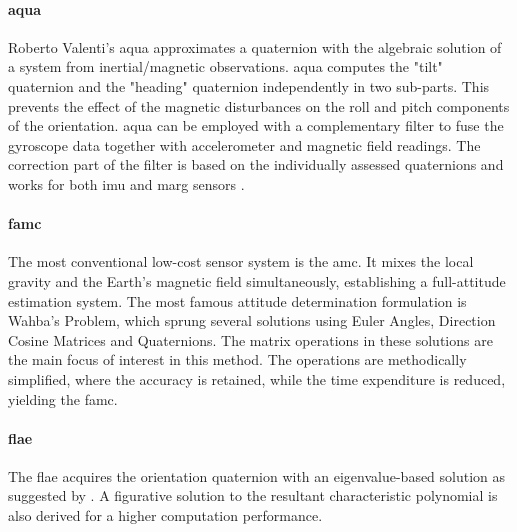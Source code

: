 \paragraph{\acrshort{aqua}}

Roberto Valenti's \acrfull{aqua} \cite{valenti2015keeping} approximates a quaternion with the algebraic solution of a system from inertial/magnetic observations.
\acrshort{aqua} computes the "tilt" quaternion and the "heading" quaternion independently in two sub-parts. This prevents the effect of the magnetic disturbances on the roll and pitch components of the orientation.
\acrshort{aqua} can be employed with a complementary filter to fuse the gyroscope data together with accelerometer and magnetic field readings. The correction part of the filter is based on the individually assessed quaternions and works for both \acrshort{imu} and \acrfull{marg} sensors \cite{valenti2015linear}.



\paragraph{\acrshort{famc}}

The most conventional low-cost sensor system is the \acrfull{amc}. It mixes the local gravity and the Earth's magnetic field simultaneously, establishing a full-attitude estimation system.
The most famous attitude determination formulation is Wahba's Problem, which sprung several solutions using Euler Angles, Direction Cosine Matrices and Quaternions.
The matrix operations in these solutions are the main focus of interest in this method. The operations are methodically simplified, where the accuracy is retained, while the time expenditure is reduced, yielding the \acrfull{famc}.

\paragraph{\acrshort{flae}}

The \acrfull{flae} acquires the orientation quaternion with an eigenvalue-based solution as suggested by \cite{wu2018super}.
A figurative solution to the resultant characteristic polynomial is also derived for a higher computation performance.


